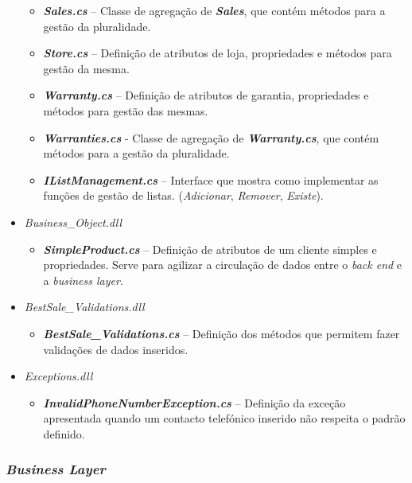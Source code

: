 \documentclass[11pt]{scrartcl} %
\begin{document}
\begin{itemize}
\begin{itemize}
			\item
			\emph{\textbf{Sales.cs}} -- Classe de agregação de \emph{\textbf{Sales}},
			que contém métodos para a gestão da pluralidade.
			\item
			\emph{\textbf{Store.cs}} -- Definição de atributos de loja, propriedades
			e métodos para gestão da mesma.
			\item
			\emph{\textbf{Warranty.cs}} -- Definição de atributos de garantia,
			propriedades e métodos para gestão das mesmas.
			\item
			\emph{\textbf{Warranties.cs}} - Classe de agregação de
			\emph{\textbf{Warranty.cs}}, que contém métodos para a gestão da
			pluralidade.
			\item
			\emph{\textbf{\textit{IListManagement.cs}}} -- Interface que mostra como implementar as funções de gestão de listas. (\textit{Adicionar}, \textit{Remover}, \textit{Existe}).
		\end{itemize}
		\item \textit{Business\_Object.dll}
		\begin{itemize}
			\item \emph{\textbf{SimpleProduct.cs}} -- Definição de atributos de um cliente simples e propriedades. Serve para agilizar a circulação de dados entre o \textit{back end} e a \textit{business layer}.
		\end{itemize}
		
		\item \textit{BestSale\_Validations.dll}
		\begin{itemize}
			\item \emph{\textbf{BestSale\_Validations.cs}} -- Definição dos métodos que permitem fazer validações de dados inseridos.
		\end{itemize}
		\item \textit{Exceptions.dll}
		\begin{itemize}
			\item \emph{\textbf{InvalidPhoneNumberException.cs}} -- Definição da exceção apresentada quando um contacto telefónico inserido não respeita o padrão definido.
		\end{itemize}
\end{itemize}

\subsubsection{\textit{Business Layer}}
\end{document}
